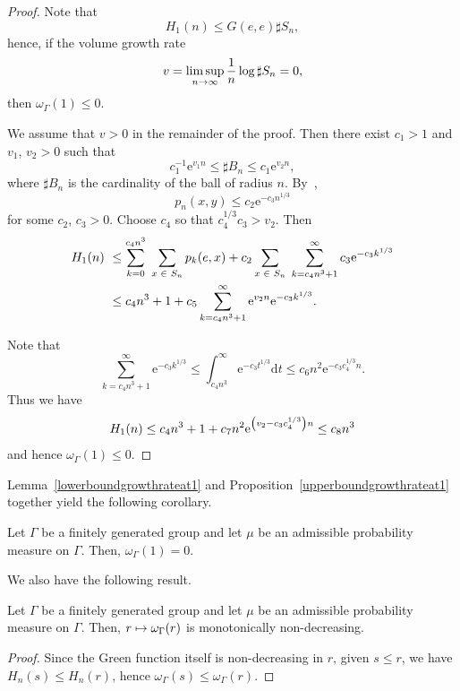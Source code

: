 \documentclass[AHL,Unicode,longabstracts]{cedram}
\newcommand{\rme}{\mathrm{e}}
\newcommand{\rmd}{\mathrm{d}}
\let\originalleft\left
\let\originalright\right
\renewcommand{\left}{\mathopen{}\mathclose\bgroup\originalleft}
\renewcommand{\right}{\aftergroup\egroup\originalright}
\let\oldin\in
\renewcommand{\in}{\mathchoice{\oldin}{\oldin}{\,\oldin\,}{\,\oldin\,}}
\renewcommand*{\to}{\mathchoice{\longrightarrow}{\rightarrow}{\rightarrow}{\rightarrow}}
\let\oldmapsto\mapsto
\renewcommand*{\mapsto}{\mathchoice{\longmapsto}{\oldmapsto}{\oldmapsto}{\oldmapsto}}
\begin{document}
\begin{proof}
Note that
\[
H_1(n) \leq G(e, e) \sharp S_n,
\]
hence, if the volume growth rate
\[
v = \limsup_{n \to \infty} \frac{1}{n} \log \sharp S_n = 0,
\]
then $\omega_{\Gamma}(1) \leq 0$.

We assume that $v > 0$ in the remainder of the proof. Then there exist $c_1 > 1$ and $v_1$, $v_2 > 0$ such that
\begin{equation}\label{hksubexp}
c_1^{-1} \rme^{v_1 n} \leq \sharp B_n \leq c_1 \rme^{v_2 n},
\end{equation}
where $\sharp B_n$ is the cardinality of the ball of radius $n$. By~\cite[Theorem~1]{V91},
\[
p_n(x, y) \leq c_2 \rme^{- c_3 n^{1/3}}
\]
for some $c_2$, $c_3 > 0$. Choose $c_4$ so that $c_4^{1/3} c_3 > v_2$. Then
\begin{align*}
H_1(n) &\ \leq \sum_{k = 0}^{c_4 n^3}\;\sum_{x \in S_n} p_k(e, x) + c_2\sum_{x \in S_n}\;\sum_{k= c_4 n^3+1}^{\infty} c_3 \rme^{- c_3 k^{1/3}}\\
&\ \leq c_4n^3 + 1 + c_5 \sum_{k = c_4 n^3+1}^{\infty} \rme^{v_2 n} \rme^{- c_3 k^{1/3}}.
\end{align*}


Note that
\[
\sum_{k = c_4 n^3+1}^{\infty} \rme^{- c_3 k^{1/3}} \leq \int_{c_4 n^3}^{\infty} \rme^{-c_3 t^{1/3}} \rmd t \leq c_6 n^{2} \rme^{- c_3 c_4^{1/3} n}.
\]
Thus we have
\[
H_1(n) \leq c_4 n^3 + 1+c_7 n^{2} \rme^{\left(v_2 - c_3 c_4^{1/3} \right) n} \leq c_8 n^3
\]
and hence $\omega_{\Gamma}(1) \leq 0$.
\end{proof}

Lemma~\ref{lowerboundgrowthrateat1} and Proposition~\ref{upperboundgrowthrateat1} together yield the following corollary.
\begin{coro}
Let $\Gamma$ be a finitely generated group and let $\mu$ be an admissible probability measure on $\Gamma$. Then, $\omega_\Gamma(1)=0$.
\end{coro}

We also have the following result.

\begin{prop}\label{omeganonincreasing}
Let $\Gamma$ be a finitely generated group and let $\mu$ be an admissible probability measure on $\Gamma$. Then, $r\mapsto\omega_\Gamma(r)$ is monotonically non-decreasing.
\end{prop}

\begin{proof}
Since the Green function itself is non-decreasing in $r$, given $s\leq r$, we have $H_n(s)\leq H_n(r)$, hence $\omega_\Gamma(s)\leq \omega_\Gamma(r)$.
\end{proof}
\end{document}
